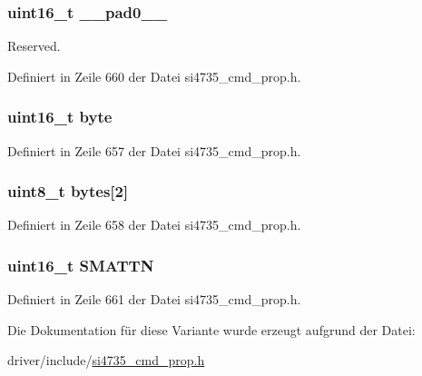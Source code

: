 \subsubsection[{\+\_\+\+\_\+pad0\+\_\+\+\_\+}]{\setlength{\rightskip}{0pt plus 5cm}uint16\+\_\+t \+\_\+\+\_\+pad0\+\_\+\+\_\+}\label{unionfm__soft__mute__max__att_a77132c2c26a75f5b8751b235cda23828}


Reserved. 



Definiert in Zeile 660 der Datei si4735\+\_\+cmd\+\_\+prop.\+h.

\hypertarget{unionfm__soft__mute__max__att_ab0549c1b5ea980a02e7eab77e21fea49}{}
\subsubsection[{byte}]{\setlength{\rightskip}{0pt plus 5cm}uint16\+\_\+t byte}\label{unionfm__soft__mute__max__att_ab0549c1b5ea980a02e7eab77e21fea49}


Definiert in Zeile 657 der Datei si4735\+\_\+cmd\+\_\+prop.\+h.

\hypertarget{unionfm__soft__mute__max__att_a46e4c05d20a047ec169f60d3167e912e}{}
\subsubsection[{bytes}]{\setlength{\rightskip}{0pt plus 5cm}uint8\+\_\+t bytes\mbox{[}2\mbox{]}}\label{unionfm__soft__mute__max__att_a46e4c05d20a047ec169f60d3167e912e}


Definiert in Zeile 658 der Datei si4735\+\_\+cmd\+\_\+prop.\+h.

\hypertarget{unionfm__soft__mute__max__att_a92e22d724c6a2970d60915dab1a06c42}{}
\subsubsection[{S\+M\+A\+T\+T\+N}]{\setlength{\rightskip}{0pt plus 5cm}uint16\+\_\+t S\+M\+A\+T\+T\+N}\label{unionfm__soft__mute__max__att_a92e22d724c6a2970d60915dab1a06c42}


Definiert in Zeile 661 der Datei si4735\+\_\+cmd\+\_\+prop.\+h.



Die Dokumentation für diese Variante wurde erzeugt aufgrund der Datei\+:\begin{DoxyCompactItemize}
\item 
driver/include/\hyperlink{si4735__cmd__prop_8h}{si4735\+\_\+cmd\+\_\+prop.\+h}\end{DoxyCompactItemize}
